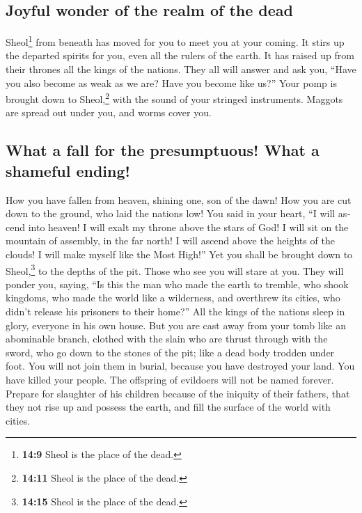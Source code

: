 \begin{paracol}{2}
\begin{otherlanguage}{english}
\hypertarget{joyful-wonder-of-the-realm-of-the-dead}{%
\subsection{Joyful wonder of the realm of the
dead}\label{joyful-wonder-of-the-realm-of-the-dead}}

 Sheol\footnote{\textbf{14:9} Sheol is the place of the
  dead.} from beneath has moved for you to meet you at your coming. It
stirs up the departed spirits for you, even all the rulers of the earth.
It has raised up from their thrones all the kings of the nations.
 They all will answer and ask you, ``Have you also become
as weak as we are? Have you become like us?''  Your pomp
is brought down to Sheol,\footnote{\textbf{14:11} Sheol is the place of
  the dead.} with the sound of your stringed instruments. Maggots are
spread out under you, and worms cover you.

\hypertarget{what-a-fall-for-the-presumptuous-what-a-shameful-ending}{%
\subsection{What a fall for the presumptuous! What a shameful
ending!}\label{what-a-fall-for-the-presumptuous-what-a-shameful-ending}}

 How you have fallen from heaven, shining one, son of the
dawn! How you are cut down to the ground, who laid the nations low!
 You said in your heart, ``I will ascend into heaven! I
will exalt my throne above the stars of God! I will sit on the mountain
of assembly, in the far north!  I will ascend above the
heights of the clouds! I will make myself like the Most High!''
 Yet you shall be brought down to Sheol,\footnote{\textbf{14:15}
  Sheol is the place of the dead.} to the depths of the pit.
 Those who see you will stare at you. They will ponder
you, saying, ``Is this the man who made the earth to tremble, who shook
kingdoms,  who made the world like a wilderness, and
overthrew its cities, who didn't release his prisoners to their home?''
 All the kings of the nations sleep in glory, everyone in
his own house.  But you are cast away from your tomb like
an abominable branch, clothed with the slain who are thrust through with
the sword, who go down to the stones of the pit; like a dead body
trodden under foot.  You will not join them in burial,
because you have destroyed your land. You have killed your people. The
offspring of evildoers will not be named forever. 
Prepare for slaughter of his children because of the iniquity of their
fathers, that they not rise up and possess the earth, and fill the
surface of the world with cities.


\end{otherlanguage}
\end{paracol}

